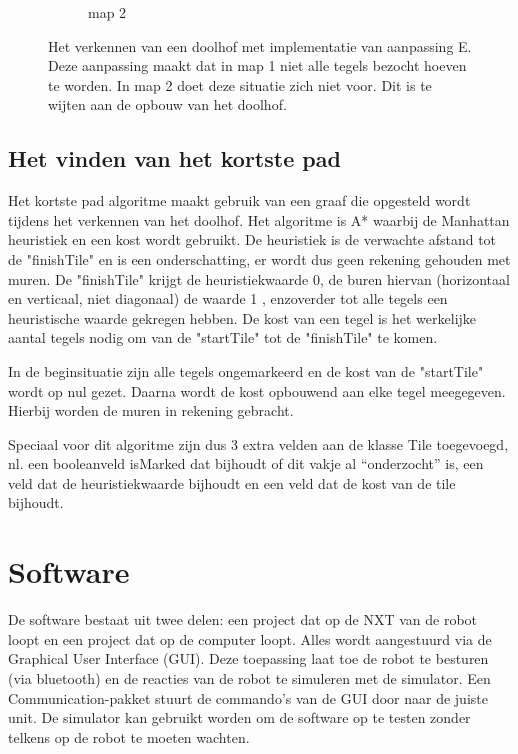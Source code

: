 \documentclass[tt3]{penoverslag}
\begin{document}
\begin{figure}
\begin{subfigure}[h]{0.36\textwidth}
                \caption{map 2}
        \end{subfigure}
 \caption{Het verkennen van een doolhof met implementatie van aanpassing E. Deze aanpassing maakt dat in map 1 niet alle tegels bezocht hoeven te worden. In map 2 doet deze situatie zich niet voor. Dit is te wijten aan de opbouw van het doolhof.}
\label{fig:resultVerkenE}
\end{figure}

\subsection{Het vinden van het kortste pad} %
\label{ssec:AlgoKortsteP}

Het kortste pad algoritme maakt gebruik van een graaf die opgesteld wordt tijdens het verkennen van het doolhof. Het algoritme is A* waarbij de Manhattan heuristiek en een kost wordt gebruikt.
De heuristiek is de verwachte afstand tot de "finishTile" en is een onderschatting, er wordt dus geen rekening gehouden met muren. De "finishTile" krijgt de heuristiekwaarde 0, de buren hiervan (horizontaal en verticaal, niet diagonaal) de waarde 1 , enzoverder tot alle tegels een heuristische waarde gekregen hebben.
De kost van een tegel is het werkelijke aantal tegels nodig om van de "startTile" tot de "finishTile" te komen.

In de beginsituatie zijn alle tegels ongemarkeerd en de kost van de "startTile" wordt op nul gezet. Daarna wordt de kost opbouwend aan elke tegel meegegeven. Hierbij worden de muren in rekening gebracht.

Speciaal voor dit algoritme zijn dus 3 extra velden aan de klasse Tile toegevoegd, nl. een booleanveld isMarked dat bijhoudt of dit vakje al “onderzocht” is, een veld dat de heuristiekwaarde bijhoudt en een veld dat de kost van de tile bijhoudt.


\section{Software} %
\label{sec:softw}
De software bestaat uit twee delen: een project dat op de NXT van de robot loopt en een project dat op de computer loopt. Alles wordt aangestuurd via de Graphical User Interface (GUI). Deze toepassing laat toe de robot te besturen (via bluetooth) en de reacties van de robot te simuleren met de simulator. Een Communication-pakket stuurt de commando's van de GUI door naar de juiste unit.
De simulator kan gebruikt worden om de software op te testen zonder telkens op de robot te moeten wachten.
\end{document}
